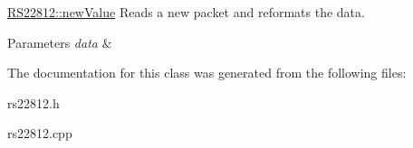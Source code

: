 \hyperlink{classRS22812_a5de59c9521bc80e37745c8c3243d9229}{R\-S22812\-::new\-Value} Reads a new packet and reformats the data. 


\begin{DoxyParams}{Parameters}
{\em data} & \\
\hline
\end{DoxyParams}


The documentation for this class was generated from the following files\-:\begin{DoxyCompactItemize}
\item 
rs22812.\-h\item 
rs22812.\-cpp\end{DoxyCompactItemize}
